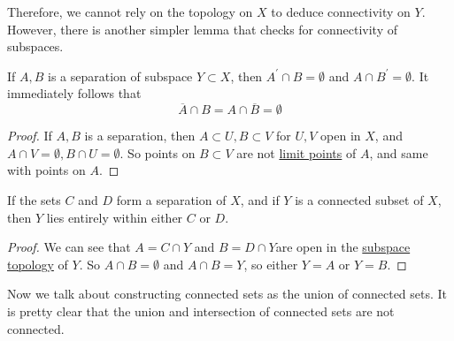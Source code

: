   Therefore, we cannot rely on the topology on $X$ to deduce connectivity on $Y$. However, there is another simpler lemma that checks for connectivity of subspaces. 

  \begin{lemma}
    \label{thm:closures-of-one-separated-component-is-disjoint}
    If $A, B$ is a separation of subspace $Y \subset X$, then $A^\prime \cap B = \emptyset$ and $A \cap B^\prime = \emptyset$. It immediately follows that 
    \begin{equation}
      \overline{A} \cap B = A \cap \overline{B} = \emptyset
    \end{equation}
  \end{lemma}
  \begin{proof}
    If $A, B$ is a separation, then $A \subset U, B \subset V$ for $U, V$ open in $X$, and $A \cap V = \emptyset, B \cap U = \emptyset$. So points on $B \subset V$ are not \hyperref[def:limit-point]{limit points} of $A$, and same with points on $A$. 
  \end{proof} 

  \begin{lemma}
    \label{thm:connected-subsets-must-be-completely-contained}
    If the sets $C$ and $D$ form a separation of $X$, and if $Y$ is a connected subset of $X$, then $Y$ lies entirely within either $C$ or $D$. 
  \end{lemma}
  \begin{proof}
    We can see that $A = C \cap Y$ and $B = D \cap Y$are open in the \hyperref[def:subspace-topology]{subspace topology} of $Y$. So $A \cap B = \emptyset$ and $A \cap B = Y$, so either $Y = A$ or $Y = B$. 
  \end{proof}

  Now we talk about constructing connected sets as the union of connected sets. It is pretty clear that the union and intersection of connected sets are not connected. 

